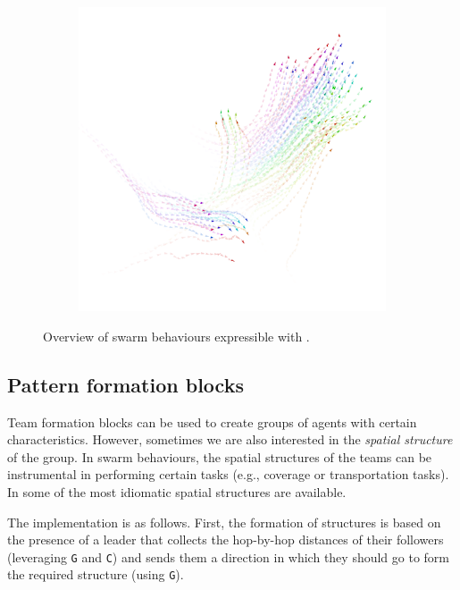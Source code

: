 \begin{figure}[t]
\begin{subfigure}{0.32\textwidth}
  \caption{}
  \label{coordination2023-macro:fig:obstacle-avoidance}
\end{subfigure}
~
\begin{subfigure}{0.32\textwidth}
  \centering
  {\includegraphics[width=\textwidth]{papers/coordination2023-macro/images/flock.png}}
  \caption{}
  \label{coordination2023-macro:fig:flock}
\end{subfigure}
\caption{Overview of swarm behaviours expressible with \MacroSwarm{}.}\label{coordination2023-macro:fig:movement-overview}
\end{figure}

\subsection{Pattern formation blocks}\label{coordination2023-macro:subsec:pattern}
Team formation blocks can be used to create groups of agents with certain characteristics.
%
However, sometimes we are also interested in the \emph{spatial structure} of the group. 
%
In swarm behaviours, the spatial structures of the teams can be instrumental in performing certain tasks (e.g., coverage or transportation tasks).
% 
In \MacroSwarm{} some of the most idiomatic spatial structures are available. 

The implementation is as follows. 
 First, the formation of structures is based on the presence of a leader that
 collects the hop-by-hop distances 
 of their followers (leveraging \lstinline|G| and \lstinline|C|) and
 sends them a direction in which they should go to form the required structure (using \lstinline|G|).

